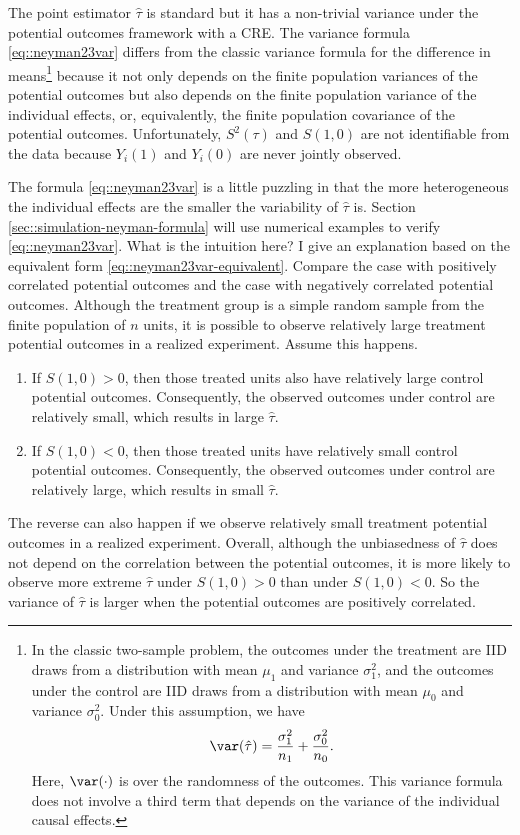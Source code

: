 The point estimator $\hat\tau$ is standard but it has a non-trivial variance under the potential outcomes framework with a CRE. The variance formula \eqref{eq::neyman23var} differs from the classic variance formula for the difference in means\footnote{In the classic two-sample problem, the outcomes under the treatment are IID draws from a distribution with mean $\mu_1$ and variance $\sigma_1^2$, and the outcomes under the control are IID draws from a distribution with mean $\mu_0$ and variance $\sigma_0^2$. Under this assumption, we have 
$$
\var(\hat{\tau} ) = \frac{\sigma_1^2}{n_1} +  \frac{\sigma_0^2}{n_0}.
$$
Here, $\var(\cdot)$ is over the randomness of the outcomes. This variance formula does not involve a third term that depends on the variance of the individual causal effects. 
} because it not only depends on the finite population variances of the potential outcomes but also depends on the finite population variance of the individual effects, or, equivalently, the finite population covariance of the potential outcomes. Unfortunately, $S^2(\tau)$ and $S(1,0)$ are not identifiable from the data because  $Y_i(1)$ and $Y_i(0)$ are never jointly observed. 




The formula \eqref{eq::neyman23var} is a little puzzling in that the more heterogeneous the individual effects are the smaller the variability of $\hat{\tau}$ is. Section \ref{sec::simulation-neyman-formula} will use numerical examples to verify \eqref{eq::neyman23var}. What is the intuition here? I give an explanation based on the equivalent form \eqref{eq::neyman23var-equivalent}. Compare the case with positively correlated potential outcomes and the case with negatively correlated potential outcomes. 
Although the treatment group is a simple random sample from the finite population of $n$ units, it is possible to observe relatively large treatment potential outcomes in a realized experiment. Assume this happens. 
\begin{enumerate}
\item
If $S(1,0) > 0$, then those treated units also have relatively large control potential outcomes. Consequently, the observed outcomes under control are relatively small, which results in large $\hat\tau$. 
\item
If $S(1,0) < 0$, then those treated units have relatively small control potential outcomes. Consequently, the observed outcomes under control are relatively large, which results in small $\hat\tau$. 
\end{enumerate}
The reverse can also happen if we observe relatively small treatment potential outcomes in a realized experiment. Overall, although the unbiasedness of $\hat\tau$ does not depend on the correlation between the potential outcomes,  it is more likely to observe more extreme $\hat\tau$ under $S(1,0) > 0$ than under $S(1,0) < 0$. So the variance of $\hat{\tau}$ is larger when the potential outcomes are positively correlated. 

